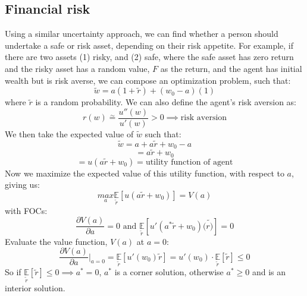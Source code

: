 \documentclass{article}
\begin{document}
\subsection{Financial risk}
Using a similar uncertainty approach, we can find whether a person should undertake a safe or risk asset, depending on their risk appetite. For example, if there are two assets (1) risky, and (2) safe, where the safe asset has zero return and the risky asset has a random value, $F$ as the return, and the agent has initial wealth but is risk averse, we can compose an optimization problem, such that: \[
\tilde{w} = a(1+ \tilde{r}) + (w_0 - a)(1)
\]
where $\tilde{r}$ is a random probability. We can also define the agent's risk aversion as: 
\[
r(w) \stackrel{\sim}{=} \frac{u''(w)}{u'(w)} > 0 \implies \text{risk aversion}
\]
We then take the expected value of $\tilde{w}$ such that:
\[
\tilde{w} = a + a\tilde{r} + w_0 - a
\]
\[
= a\tilde{r} + w_0
\]
\[
=u(a\tilde{r} + w_0) = \text {utility function of agent}
\]
Now we maximize the expected value of this utility function, with respect to $a$, giving us: 
\[
\underset{a}{max}\underset{\tilde{r}}{\mathbb{E}}[u(a\tilde{r} + w_0)] = V(a)
\]
with FOCs:
\[
\frac{\partial V(a)}{\partial a} = 0 \text{ and } \underset{\tilde{r}}{\mathbb{E}}[u'(a^*\tilde{r} + w_0)(\tilde{r)}] = 0
\]
Evaluate the value function, $V(a)$ at $a=0$:
\[
\frac{\partial V(a)}{\partial a} \bigg|_{a=0} = \underset{\tilde{r}}{\mathbb{E}}[u'(w_0)\tilde{r}] = u'(w_0)\cdot \underset{\tilde{r}}{\mathbb{E}}[\tilde{r}] \leq 0
\]
So if $\underset{\tilde{r}}{\mathbb{E}}[\tilde{r}] \leq 0 \implies a^* = 0 $, $a^*$ is a corner solution, otherwise $a^* \geq 0$ and is an interior solution. 
\end{document}
